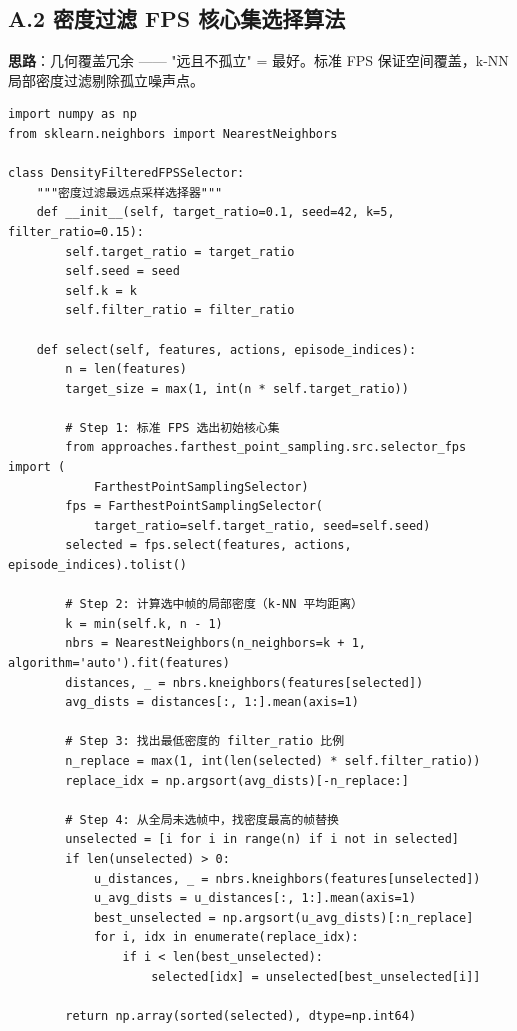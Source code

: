 \documentclass[12pt,a4paper]{article}
\begin{document}
\subsection{A.2 密度过滤 FPS 核心集选择算法}

\textbf{思路}：几何覆盖冗余 —— "远且不孤立" = 最好。标准 FPS 保证空间覆盖，k-NN 局部密度过滤剔除孤立噪声点。

\begin{verbatim}
import numpy as np
from sklearn.neighbors import NearestNeighbors

class DensityFilteredFPSSelector:
    """密度过滤最远点采样选择器"""
    def __init__(self, target_ratio=0.1, seed=42, k=5, filter_ratio=0.15):
        self.target_ratio = target_ratio
        self.seed = seed
        self.k = k
        self.filter_ratio = filter_ratio
    
    def select(self, features, actions, episode_indices):
        n = len(features)
        target_size = max(1, int(n * self.target_ratio))
        
        # Step 1: 标准 FPS 选出初始核心集
        from approaches.farthest_point_sampling.src.selector_fps import (
            FarthestPointSamplingSelector)
        fps = FarthestPointSamplingSelector(
            target_ratio=self.target_ratio, seed=self.seed)
        selected = fps.select(features, actions, episode_indices).tolist()
        
        # Step 2: 计算选中帧的局部密度（k-NN 平均距离）
        k = min(self.k, n - 1)
        nbrs = NearestNeighbors(n_neighbors=k + 1, algorithm='auto').fit(features)
        distances, _ = nbrs.kneighbors(features[selected])
        avg_dists = distances[:, 1:].mean(axis=1)
        
        # Step 3: 找出最低密度的 filter_ratio 比例
        n_replace = max(1, int(len(selected) * self.filter_ratio))
        replace_idx = np.argsort(avg_dists)[-n_replace:]
        
        # Step 4: 从全局未选帧中，找密度最高的帧替换
        unselected = [i for i in range(n) if i not in selected]
        if len(unselected) > 0:
            u_distances, _ = nbrs.kneighbors(features[unselected])
            u_avg_dists = u_distances[:, 1:].mean(axis=1)
            best_unselected = np.argsort(u_avg_dists)[:n_replace]
            for i, idx in enumerate(replace_idx):
                if i < len(best_unselected):
                    selected[idx] = unselected[best_unselected[i]]
        
        return np.array(sorted(selected), dtype=np.int64)
\end{verbatim}
\end{document}
